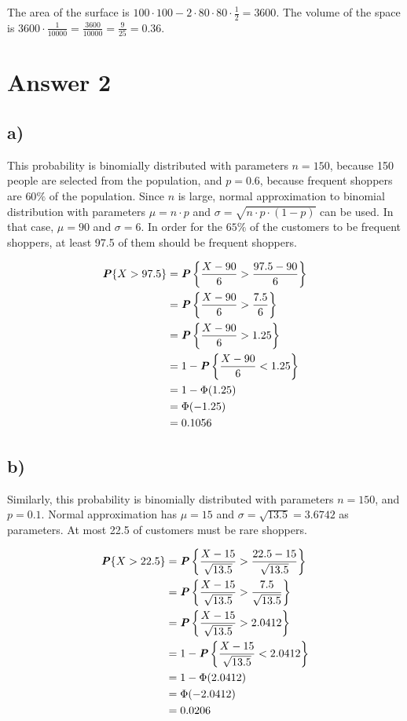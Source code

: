 \documentclass[12pt]{article}
\newcommand{\boldP}{\textbf{\textit{P}}}
\begin{document}
\noindent
The area of the surface is $100 \cdot 100 - 2 \cdot 80 \cdot 80 \cdot
\frac{1}{2} = 3600$. The volume of the space is $3600 \cdot \frac{1}{10000} =
\frac{3600}{10000} = \frac{9}{25} = 0.36$.

\newpage

\section*{Answer 2}

\subsection*{a)}

This probability is binomially distributed with parameters $n = 150$, because
150 people are selected from the population, and $p = 0.6$, because frequent
shoppers are $60\%$ of the population. Since $n$ is large, normal approximation
to binomial distribution with parameters $\mu = n \cdot p$ and $\sigma = \sqrt{n
\cdot p \cdot (1 - p)}$ can be used. In that case, $\mu = 90$ and $\sigma = 6$.
In order for the $65\%$ of the customers to be frequent shoppers, at least 97.5
of them should be frequent shoppers.

\begin{align*}
  \boldP\{X > 97.5\}
    &= \boldP \left\{ \frac{X - 90}{6} > \frac{97.5 - 90}{6} \right\} \\
    &= \boldP \left\{ \frac{X - 90}{6} > \frac{7.5}{6} \right\} \\
    &= \boldP \left\{ \frac{X - 90}{6} > 1.25 \right\} \\
    &= 1 - \boldP \left\{ \frac{X - 90}{6} < 1.25 \right\} \\
    &= 1 - \Phi(1.25) \\
    &= \Phi(-1.25) \\
    &= 0.1056
\end{align*}

\subsection*{b)}

Similarly, this probability is binomially distributed with parameters $n = 150$,
and $p = 0.1$. Normal approximation has $\mu = 15$ and $\sigma = \sqrt{13.5} =
3.6742$ as parameters. At most 22.5 of customers must be rare shoppers.

\begin{align*}
  \boldP\{X > 22.5\}
    &= \boldP \left\{ \frac{X - 15}{\sqrt{13.5}}
                    > \frac{22.5 - 15}{\sqrt{13.5}} \right\} \\
    &= \boldP \left\{ \frac{X - 15}{\sqrt{13.5}}
                    > \frac{7.5}{\sqrt{13.5}} \right\} \\
    &= \boldP \left\{ \frac{X - 15}{\sqrt{13.5}} > 2.0412 \right\} \\
    &= 1 - \boldP \left\{ \frac{X - 15}{\sqrt{13.5}} < 2.0412 \right\} \\
    &= 1 - \Phi(2.0412) \\
    &= \Phi(-2.0412) \\
    &= 0.0206 \\
\end{align*}
\end{document}
